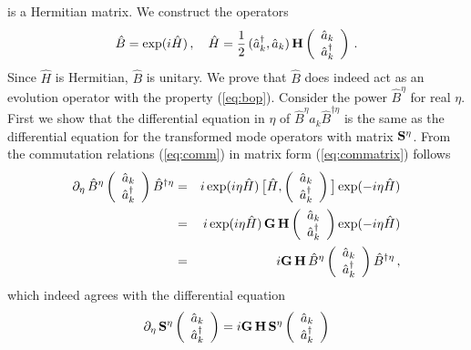 \documentclass[12pt,amsmath,amssymb]{article}
\def\underline#1{{\bf #1}}
\numberwithin{equation}{section}
\begin{document}
is a Hermitian matrix. We construct the operators \cite{LeoNeu}
\begin{equation}
\label{eq:ham} \hat{B} = \exp(i\hat{H}) \,,\quad \hat{H} =
\frac{1}{2}\,(\hat{a}_k^\dagger, \hat{a}_k)\, \underline{H} \left(
    \begin{array}{c}
     \hat{a}_k  \\
     \hat{a}_k^\dagger
    \end{array}
\right)
\,.
\end{equation}
Since $\hat{H}$ is Hermitian, $\hat{B}$ is unitary. We prove that
$\hat{B}$ does indeed act as an evolution operator with the
property (\ref{eq:bop}). Consider the power $\hat{B}^\eta$ for
real $\eta$. First we show that the differential equation in
$\eta$ of $\hat{B}^\eta \hat{a}_k \hat{B}^{\dagger\eta}$ is the
same as the differential equation for the transformed mode
operators with matrix $\underline{S}^\eta$. From the commutation
relations (\ref{eq:comm}) in matrix form (\ref{eq:commatrix})
follows
\begin{eqnarray}
\partial_\eta\, \hat{B}^\eta
\left(
    \begin{array}{c}
     \hat{a}_k  \\
     \hat{a}_k^\dagger
    \end{array}
\right) \hat{B}^{\dagger\eta} &=& i\exp(i\eta\hat{H})\,
\big[\hat{H}, \left(
    \begin{array}{c}
     \hat{a}_k  \\
     \hat{a}_k^\dagger
    \end{array}
\right) \big] \exp(-i\eta\hat{H})
\nonumber\\
&=&  i\exp(i\eta\hat{H})\,
 \underline{G}\,\underline{H} \left(
    \begin{array}{c}
     \hat{a}_k  \\
     \hat{a}_k^\dagger
    \end{array}
\right)
\exp(-i\eta\hat{H})
\nonumber\\
&=& i\underline{G}\,\underline{H}\,\hat{B}^\eta \left(
    \begin{array}{c}
     \hat{a}_k  \\
     \hat{a}_k^\dagger
    \end{array}
\right) \hat{B}^{\dagger\eta} \,,
\end{eqnarray}
which indeed agrees with the differential equation
\begin{equation}
\partial_\eta\,
\underline{S}^\eta \left(
    \begin{array}{c}
     \hat{a}_k  \\
     \hat{a}_k^\dagger
    \end{array}
\right) = i\underline{G}\,\underline{H}\,\underline{S}^\eta \left(
    \begin{array}{c}
     \hat{a}_k  \\
     \hat{a}_k^\dagger
    \end{array}
\right)
\end{equation}
\end{document}

